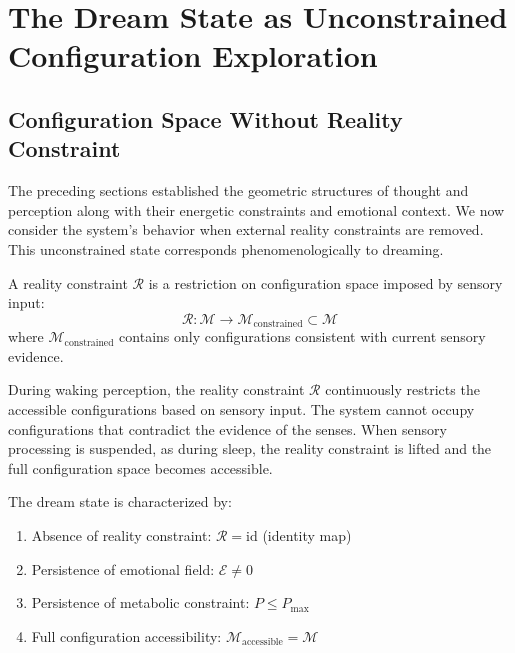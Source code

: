 \section{The Dream State as Unconstrained Configuration Exploration}
\label{sec:dream}

\subsection{Configuration Space Without Reality Constraint}

The preceding sections established the geometric structures of thought and perception along with their energetic constraints and emotional context. We now consider the system's behavior when external reality constraints are removed. This unconstrained state corresponds phenomenologically to dreaming.

\begin{definition}
\label{def:reality_constraint}
A reality constraint $\mathcal{R}$ is a restriction on configuration space imposed by sensory input:
\begin{equation}
\mathcal{R}: \mathcal{M} \rightarrow \mathcal{M}_{\text{constrained}} \subset \mathcal{M}
\label{eq:reality_constraint}
\end{equation}
where $\mathcal{M}_{\text{constrained}}$ contains only configurations consistent with current sensory evidence.
\end{definition}

During waking perception, the reality constraint $\mathcal{R}$ continuously restricts the accessible configurations based on sensory input. The system cannot occupy configurations that contradict the evidence of the senses. When sensory processing is suspended, as during sleep, the reality constraint is lifted and the full configuration space becomes accessible.

\begin{theorem}
\label{thm:dream_state}
The dream state is characterized by:
\begin{enumerate}
\item Absence of reality constraint: $\mathcal{R} = \text{id}$ (identity map)
\item Persistence of emotional field: $\mathcal{E} \neq 0$
\item Persistence of metabolic constraint: $P \leq P_{\max}$
\item Full configuration accessibility: $\mathcal{M}_{\text{accessible}} = \mathcal{M}$
\end{enumerate}
\end{theorem}

